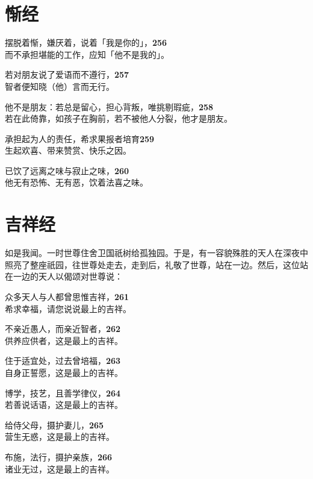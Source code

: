 \section{惭经}


摆脱着惭，嫌厌着，说着「我是你的」，\hfill{\grayfootnotesize \textbf{256}} \\
而不承担堪能的工作，应知「他不是我的」。


若对朋友说了爱语而不遵行，\hfill{\grayfootnotesize \textbf{257}} \\
智者便知晓（他）言而无行。


他不是朋友：若总是留心，担心背叛，唯挑剔瑕疵，\hfill{\grayfootnotesize \textbf{258}} \\
若在此倚靠，如孩子在胸前，若不被他人分裂，他才是朋友。


承担起为人的责任，希求果报者培育\hfill{\grayfootnotesize \textbf{259}} \\
生起欢喜、带来赞赏、快乐之因。


已饮了远离之味与寂止之味，\hfill{\grayfootnotesize \textbf{260}} \\
他无有恐怖、无有恶，饮着法喜之味。


\section{吉祥经}


如是我闻。一时世尊住舍卫国祇树给孤独园。于是，有一容貌殊胜的天人在深夜中照亮了整座祇园，往世尊处走去，走到后，礼敬了世尊，站在一边。然后，这位站在一边的天人以偈颂对世尊说：


众多天人与人都曾思惟吉祥，\hfill{\grayfootnotesize \textbf{261}} \\
希求幸福，请您说说最上的吉祥。


不亲近愚人，而亲近智者，\hfill{\grayfootnotesize \textbf{262}} \\
供养应供者，这是最上的吉祥。


住于适宜处，过去曾培福，\hfill{\grayfootnotesize \textbf{263}} \\
自身正誓愿，这是最上的吉祥。


博学，技艺，且善学律仪，\hfill{\grayfootnotesize \textbf{264}} \\
若善说话语，这是最上的吉祥。


给侍父母，摄护妻儿，\hfill{\grayfootnotesize \textbf{265}} \\
营生无惑，这是最上的吉祥。


布施，法行，摄护亲族，\hfill{\grayfootnotesize \textbf{266}} \\
诸业无过，这是最上的吉祥。


